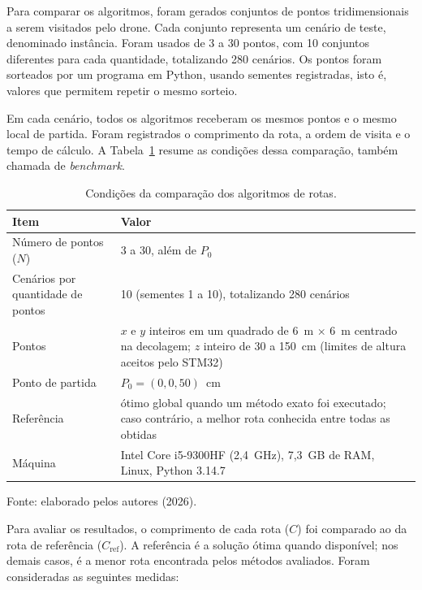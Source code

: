 Para comparar os algoritmos, foram gerados conjuntos de pontos tridimensionais a serem visitados pelo drone. Cada conjunto representa um cenário de teste, denominado instância. Foram usados de 3 a 30 pontos, com 10 conjuntos diferentes para cada quantidade, totalizando 280 cenários. Os pontos foram sorteados por um programa em Python, usando sementes registradas, isto é, valores que permitem repetir o mesmo sorteio.

Em cada cenário, todos os algoritmos receberam os mesmos pontos e o mesmo local de partida. Foram registrados o comprimento da rota, a ordem de visita e o tempo de cálculo. A Tabela~\ref{tab:rotas_protocolo} resume as condições dessa comparação, também chamada de \textit{benchmark}.

\begin{table}[H]
    \centering
    \caption{Condições da comparação dos algoritmos de rotas.}
    \label{tab:rotas_protocolo}
    \small
    \renewcommand{\arraystretch}{1.25}
    \begin{tabular}{p{4.2cm}p{9.6cm}}
        \hline
        \textbf{Item} & \textbf{Valor} \\
        \hline
        Número de pontos ($N$) & 3 a 30, além de $P_0$ \\
        Cenários por quantidade de pontos & 10 (sementes 1 a 10), totalizando 280 cenários \\
        Pontos & $x$ e $y$ inteiros em um quadrado de 6~m $\times$ 6~m centrado na decolagem; $z$ inteiro de 30 a 150~cm (limites de altura aceitos pelo STM32) \\
        Ponto de partida & $P_0 = (0, 0, 50)$~cm \\
        Referência & ótimo global quando um método exato foi executado; caso contrário, a melhor rota conhecida entre todas as obtidas \\
        Máquina & Intel Core i5-9300HF (2,4~GHz), 7,3~GB de RAM, Linux, Python 3.14.7 \\
        \hline
    \end{tabular}
    \par\vspace{0.2cm}
    \footnotesize Fonte: elaborado pelos autores (2026).
\end{table}

Para avaliar os resultados, o comprimento de cada rota ($C$) foi comparado ao da rota de referência ($C_{\mathrm{ref}}$). A referência é a solução ótima quando disponível; nos demais casos, é a menor rota encontrada pelos métodos avaliados. Foram consideradas as seguintes medidas:

